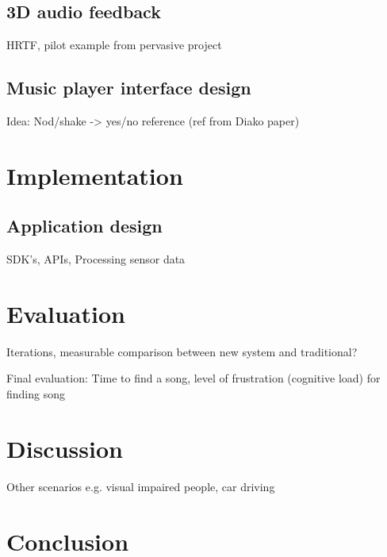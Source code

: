 \documentclass{article}
\begin{document}
\subsection{3D audio feedback}
HRTF, pilot example from pervasive project

\subsection{Music player interface design}
Idea: Nod/shake -> yes/no reference (ref from Diako paper)


\section{Implementation}

\subsection{Application design}
SDK's, APIs, Processing sensor data


\section{Evaluation}
Iterations, measurable comparison between new system and traditional?

Final evaluation: Time to find a song, level of frustration (cognitive load) for finding song

\section{Discussion}
Other scenarios e.g. visual impaired people, car driving


\section{Conclusion}



\clearpage



\end{document}
